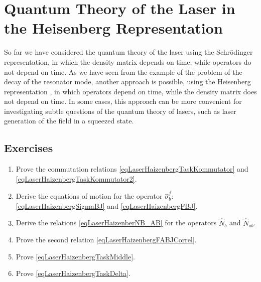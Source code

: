 \chapter{Quantum Theory of the Laser in the Heisenberg Representation}
\label{chLaser2}

So far we have considered the quantum theory of the laser using
the Schrödinger representation, in which the density matrix depends on time,
while operators do not depend on time. As we have seen from the example
of the problem of the decay of the resonator mode, another approach is possible,
using the Heisenberg representation
\cite{bScullyQuantumOptics2003}, 
in which
operators depend on time, while the density matrix 
does not depend on time. In some cases,
this approach can be more convenient for investigating subtle
questions of the quantum theory of lasers, such as laser generation
of the field in a squeezed state.






\section{Exercises}
\begin{enumerate}
\item Prove the commutation relations
  \eqref{eqLaserHaizenbergTaskKommutator} and \eqref{eqLaserHaizenbergTaskKommutator2}.
\item Derive the equations of motion for the operator $\hat{\sigma}_b^j$: \eqref{eqLaserHaizenbergSigmaBJ} and 
\eqref{eqLaserHaizenbergFBJ}.
\item Derive the relations \eqref{eqLaserHaizenberNB_AB} for
  the operators $\hat{N}_b$ and $\hat{N}_{ab}$.
\item Prove the second relation \eqref{eqLaserHaizenbergFABJCorrel}.
\item Prove \eqref{eqLaserHaizenbergTaskMiddle}.
\item Prove \eqref{eqLaserHaizenbergTaskDelta}.
\end{enumerate}


